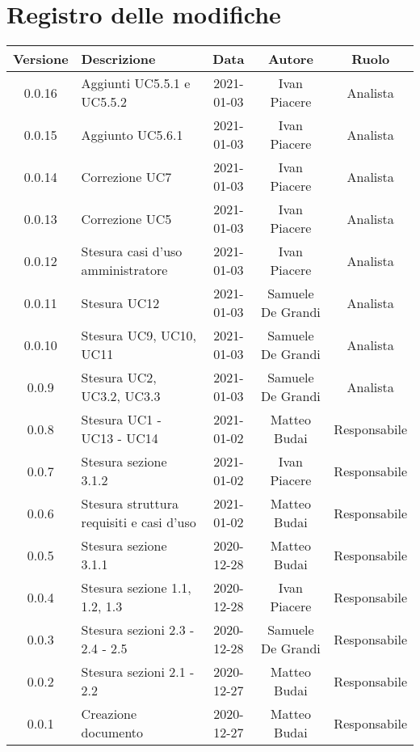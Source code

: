 \section*{Registro delle modifiche}

\begin{center}
	\begin{longtable}{|c|p{5cm}|c|c|c|}
		\hline
		\rowcolor{lighter-grayer}
		\textbf{Versione} & \textbf{Descrizione} & \textbf{Data} & \textbf{Autore} & \textbf{Ruolo} \\
		\hline
		\endfirsthead
		
		\hline
		0.0.16 & Aggiunti UC5.5.1 e UC5.5.2 & 2021-01-03 & Ivan Piacere & Analista \\
		\hline
		0.0.15 & Aggiunto UC5.6.1 & 2021-01-03 & Ivan Piacere & Analista \\
		\hline
		0.0.14 & Correzione UC7 & 2021-01-03 & Ivan Piacere & Analista \\
		\hline
		0.0.13 & Correzione UC5 & 2021-01-03 & Ivan Piacere & Analista \\
		\hline
		0.0.12 & Stesura casi d'uso amministratore & 2021-01-03 & Ivan Piacere & Analista \\
		\hline
		0.0.11 & Stesura UC12  & 2021-01-03 & Samuele De Grandi & Analista \\
		\hline
	    0.0.10 & Stesura UC9, UC10, UC11  & 2021-01-03 & Samuele De Grandi & Analista \\
		\hline
		0.0.9 & Stesura UC2, UC3.2, UC3.3  & 2021-01-03 & Samuele De Grandi & Analista \\
		\hline
		0.0.8 & Stesura UC1 - UC13 - UC14 & 2021-01-02 & Matteo Budai & Responsabile \\
		\hline
		0.0.7 & Stesura sezione 3.1.2 & 2021-01-02 & Ivan Piacere & Responsabile\\
		\hline
		0.0.6 & Stesura struttura requisiti e casi d'uso & 2021-01-02 & Matteo Budai & Responsabile \\
		\hline
		0.0.5 & Stesura sezione 3.1.1 & 2020-12-28 & Matteo Budai & Responsabile \\
		\hline
		0.0.4 & Stesura sezione 1.1, 1.2, 1.3 & 2020-12-28 & Ivan Piacere & Responsabile \\
		\hline
		0.0.3 & Stesura sezioni 2.3 - 2.4 - 2.5 & 2020-12-28 & Samuele De Grandi & Responsabile \\
		\hline
		0.0.2 & Stesura sezioni 2.1 - 2.2 & 2020-12-27 & Matteo Budai & Responsabile \\
		\hline
		0.0.1 & Creazione documento & 2020-12-27 & Matteo Budai & Responsabile \\
		\hline
		
	\end{longtable}
\end{center}
